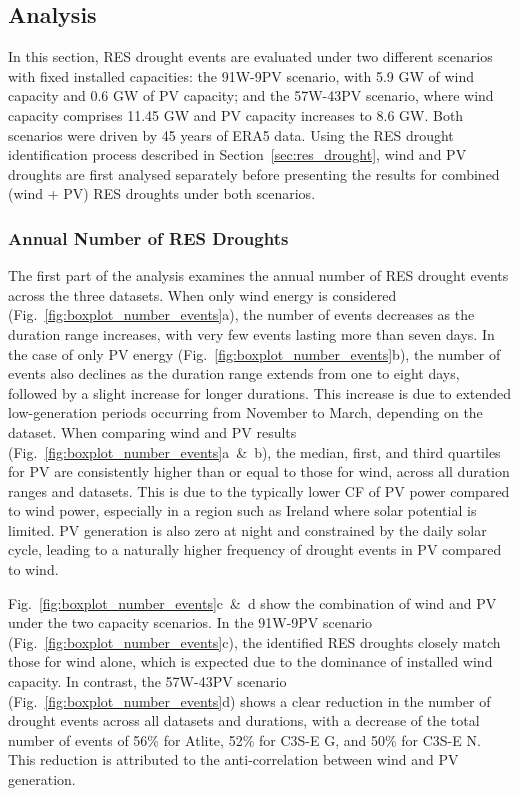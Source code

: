 \documentclass[preprint, 12pt]{elsarticle}
\begin{document}
\newpage
\subsection{Analysis}
\label{sec:Analysis}

In this section, RES drought events are evaluated under two different scenarios with fixed installed capacities: the 91W-9PV scenario, with 5.9 GW of wind capacity and 0.6 GW of PV capacity; and the 57W-43PV scenario, where wind capacity comprises 11.45 GW and PV capacity increases to 8.6 GW. Both scenarios were driven by 45 years of ERA5 data. Using the RES drought identification process described in Section~\ref{sec:res_drought}, wind and PV droughts are first analysed separately before presenting the results for combined (wind + PV) RES droughts under both scenarios.

\subsubsection{Annual Number of RES Droughts}

The first part of the analysis examines the annual number of RES drought events across the three datasets. When only wind energy is considered (Fig.~\ref{fig:boxplot_number_events}a), the number of events decreases as the duration range increases, with very few events lasting more than seven days. In the case of only PV energy (Fig.~\ref{fig:boxplot_number_events}b), the number of events also declines as the duration range extends from one to eight days, followed by a slight increase for longer durations. This increase is due to extended low-generation periods occurring from November to March, depending on the dataset. When comparing wind and PV results (Fig.~\ref{fig:boxplot_number_events}a~\&~b), the median, first, and third quartiles for PV are consistently higher than or equal to those for wind, across all duration ranges and datasets. This is due to the typically lower CF of PV power compared to wind power, especially in a region such as Ireland where solar potential is limited. PV generation is also zero at night and constrained by the daily solar cycle, leading to a naturally higher frequency of drought events in PV compared to wind.

Fig.~\ref{fig:boxplot_number_events}c~\&~d show the combination of wind and PV under the two capacity scenarios. In the 91W-9PV scenario (Fig.~\ref{fig:boxplot_number_events}c), the identified RES droughts closely match those for wind alone, which is expected due to the dominance of installed wind capacity. In contrast, the 57W-43PV scenario (Fig.~\ref{fig:boxplot_number_events}d) shows a clear reduction in the number of drought events across all datasets and durations, with a decrease of the total number of events of 56\% for Atlite, 52\% for C3S-E G, and 50\% for C3S-E N. This reduction is attributed to the anti-correlation between wind and PV generation.
\end{document}
